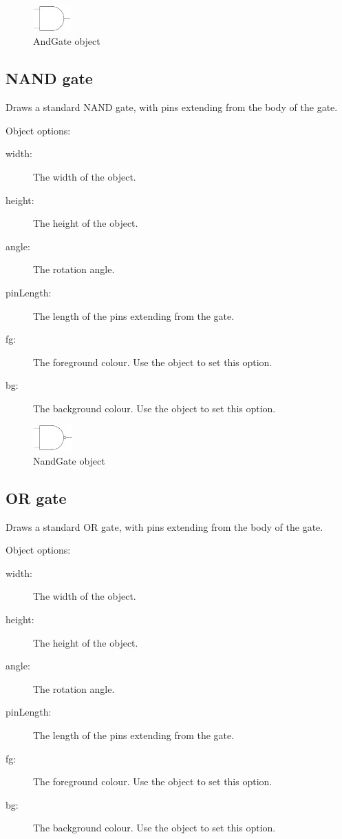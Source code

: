 \begin{figure}[h]
\centerline{\includegraphics[height=1cm]{electronics/AndGate}}
\caption{AndGate object}
\label{fig:and_gate}
\end{figure}

\subsection{NAND gate}
Draws a standard NAND gate, with pins extending from the body of the gate.

Object options:
\begin{description}
\item[width:] The width of the object.
\item[height:] The height of the object.
\item[angle:] The rotation angle.
\item[pinLength:] The length of the pins extending from the gate.
\item[fg:] The foreground colour.  Use the  object to set this
option.
\item[bg:] The background colour.  Use the  object to set this
option.
\end{description}

\begin{figure}[h]
\centerline{\includegraphics[height=1cm]{electronics/NandGate}}
\caption{NandGate object}
\label{fig:nand_gate}
\end{figure}

\subsection{OR gate}
Draws a standard OR gate, with pins extending from the body of the gate.

Object options:
\begin{description}
\item[width:] The width of the object.
\item[height:] The height of the object.
\item[angle:] The rotation angle.
\item[pinLength:] The length of the pins extending from the gate.
\item[fg:] The foreground colour.  Use the  object to set this
option.
\item[bg:] The background colour.  Use the  object to set this
option.
\end{description}

